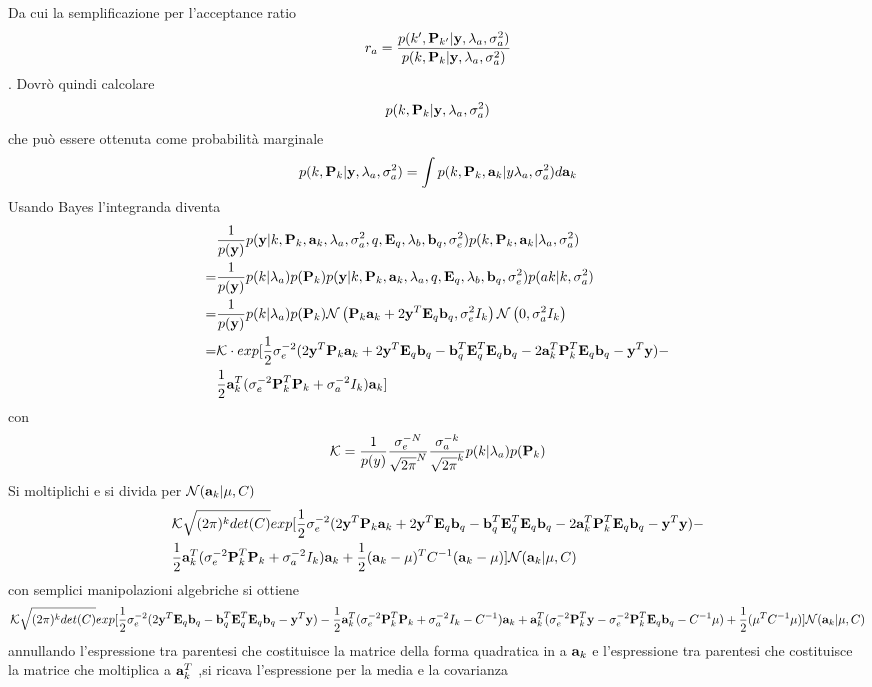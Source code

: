 Da cui la semplificazione per l'acceptance ratio
\begin{equation}
r_a=\frac{p(k',\pknew|\y,\la,\va)}{p(k,\pk|\y,\la,\va)}
\end{equation}.
Dovrò quindi calcolare
\begin{equation}
p(k,\pk|\y,\la,\va)
\end{equation}
che può essere ottenuta come probabilità marginale
\begin{equation}
p(k,\pk|\y,\la,\va)=\int p(k,\pk,\ak|y\la,\va)d\ak
\end{equation}
Usando Bayes l'integranda diventa
\begin{align*}
& \frac{1}{p(\y)}p(\y|k,\pk,\ak,\la,\va,q,\eq,\lb,\bq,\ve)p(k,\pk,\ak|\la,\va)\\
=&\frac{1}{p(\y)}p(k|\la)p(\pk)p(\y|k,\pk,\ak,\la,q,\eq,\lb,\bq,\ve)p(ak|k,\va)\\
=&\frac{1}{p(\y)}p(k|\la)p(\pk)\normal{\pk\ak+2\y^T\eq\bq}{\ve I_k}\normal{0}{\va I_k}\\
=& \mathcal{K}\cdot exp[ \mez \sigma_e^{-2}(2\y^T\pk\ak+2\y^T\eq\bq-\bq^T\eq^T\eq\bq-2\ak^T\pk^T\eq\bq-\y^T\y)-\\
&\mez\ak^T(\sigma_e^{-2}\pk^T\pk+\sigma_a^{-2}I_k)\ak ]
\end{align*}
con
\begin{equation}
\mathcal{K}=\frac{1}{p(y)}\frac{\sigma_e^{-N}}{\sqrt{2\pi}^N}\frac{\sigma_a^{-k}}{\sqrt{2\pi}^k}p(k|\la)p(\pk)
\end{equation}
Si moltiplichi e si divida per $\mathcal{N}({\ak |\mu,C})$
\begin{align*}
&\mathcal{K}\sqrt{(2\pi)^k det(C)} exp[ \mez \sigma_e^{-2}(2\y^T\pk\ak+2\y^T\eq\bq-\bq^T\eq^T\eq\bq-2\ak^T\pk^T\eq\bq-\y^T\y)-\\
&\mez\ak^T(\sigma_e^{-2}\pk^T\pk+\sigma_a^{-2}I_k)\ak +\mez(\ak-\mu)^TC^{-1}(\ak-\mu) ]\mathcal{N}(\ak|\mu,C)
\end{align*}
con semplici manipolazioni algebriche si ottiene
\begin{align*}
\mathcal{K}\sqrt{(2\pi)^k det(C)}
exp[\mez\sigma_e^{-2}(2\y^T\eq\bq-\bq^T\eq^T\eq\bq-\y^T\y)-\mez\ak^T(\sigma_e^{-2}\pk^T\pk+\sigma_a^{-2} I_k-C^{-1})\ak+\ak^T(\sigma_e^{-2}\pk^T\y-\sigma_e^{-2}\pk^T\eq\bq-C^{-1}\mu)+\mez(\mu^TC^{-1}\mu)]\mathcal{N}(\ak |\mu, C)
\end{align*}
annullando l’espressione tra parentesi che costituisce la matrice della forma quadratica in a $\ak$ e l’espressione tra parentesi che costituisce la matrice che moltiplica a $\ak^T$ ,si ricava l’espressione per la media e la covarianza
